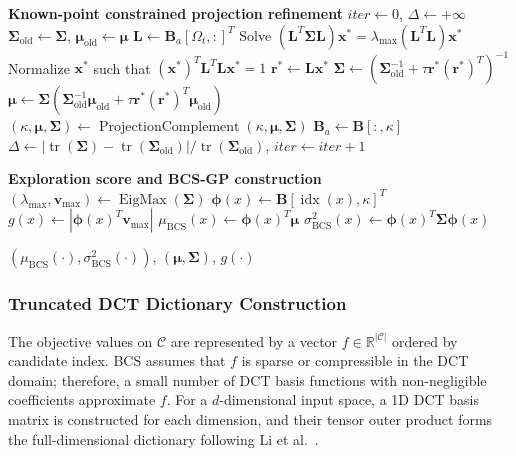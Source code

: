 \documentclass[lettersize,journal]{IEEEtran}
\begin{document}
\begin{algorithm}[!t]
\begin{algorithmic}[1]
\STATE \textbf{Known-point constrained projection refinement}
\STATE $iter\leftarrow0$, $\Delta\leftarrow+\infty$
    \STATE $\boldsymbol{\Sigma}_{\mathrm{old}}\leftarrow\boldsymbol{\Sigma}$, $\boldsymbol{\mu}_{\mathrm{old}}\leftarrow\boldsymbol{\mu}$
    \STATE $\mathbf{L}\leftarrow\mathbf{B}_a[\Omega_t,:]^T$
    \STATE Solve $(\mathbf{L}^T\boldsymbol{\Sigma}\mathbf{L})\mathbf{x}^*=\lambda_{\max}(\mathbf{L}^T\mathbf{L})\mathbf{x}^*$
    \STATE Normalize $\mathbf{x}^*$ such that $(\mathbf{x}^*)^T\mathbf{L}^T\mathbf{L}\mathbf{x}^*=1$
    \STATE $\mathbf{r}^*\leftarrow\mathbf{L}\mathbf{x}^*$
    \STATE $\boldsymbol{\Sigma}\leftarrow\left(\boldsymbol{\Sigma}_{\mathrm{old}}^{-1}+\tau\mathbf{r}^*(\mathbf{r}^*)^T\right)^{-1}$
    \STATE $\boldsymbol{\mu}\leftarrow\boldsymbol{\Sigma}\left(\boldsymbol{\Sigma}_{\mathrm{old}}^{-1}\boldsymbol{\mu}_{\mathrm{old}}+\tau\mathbf{r}^*(\mathbf{r}^*)^T\boldsymbol{\mu}_{\mathrm{old}}\right)$
    \STATE $(\kappa,\boldsymbol{\mu},\boldsymbol{\Sigma})\leftarrow\operatorname{ProjectionComplement}(\kappa,\boldsymbol{\mu},\boldsymbol{\Sigma})$
    \STATE $\mathbf{B}_a\leftarrow\mathbf{B}[:,\kappa]$
    \STATE $\Delta\leftarrow|\operatorname{tr}(\boldsymbol{\Sigma})-\operatorname{tr}(\boldsymbol{\Sigma}_{\mathrm{old}})|/\operatorname{tr}(\boldsymbol{\Sigma}_{\mathrm{old}})$, $iter\leftarrow iter+1$
\ENDWHILE

\STATE \textbf{Exploration score and BCS-GP construction}
\STATE $(\lambda_{\max},\mathbf{v}_{\max})\leftarrow\operatorname{EigMax}(\boldsymbol{\Sigma})$
\STATE $\boldsymbol{\phi}(x)\leftarrow\mathbf{B}[\operatorname{idx}(x),\kappa]^T$
\STATE $g(x)\leftarrow|\boldsymbol{\phi}(x)^T\mathbf{v}_{\max}|$
\STATE $\mu_{\mathrm{BCS}}(x)\leftarrow\boldsymbol{\phi}(x)^T\boldsymbol{\mu}$
\STATE $\sigma_{\mathrm{BCS}}^2(x)\leftarrow\boldsymbol{\phi}(x)^T\boldsymbol{\Sigma}\boldsymbol{\phi}(x)$

\RETURN $(\mu_{\mathrm{BCS}}(\cdot),\sigma_{\mathrm{BCS}}^2(\cdot))$, $(\boldsymbol{\mu},\boldsymbol{\Sigma})$, $g(\cdot)$
\end{algorithmic}
\end{algorithm}

\subsubsection{Truncated DCT Dictionary Construction}
The objective values on $\mathcal{C}$ are represented by a vector $f \in \mathbb{R}^{|\mathcal{C}|}$ ordered by candidate index. BCS assumes that $f$ is sparse or compressible in the DCT domain; therefore, a small number of DCT basis functions with non-negligible coefficients approximate $f$. For a $d$-dimensional input space, a 1D DCT basis matrix is constructed for each dimension, and their tensor outer product forms the full-dimensional dictionary following Li et al.\ \cite{li2025efficient}.
\end{document}
